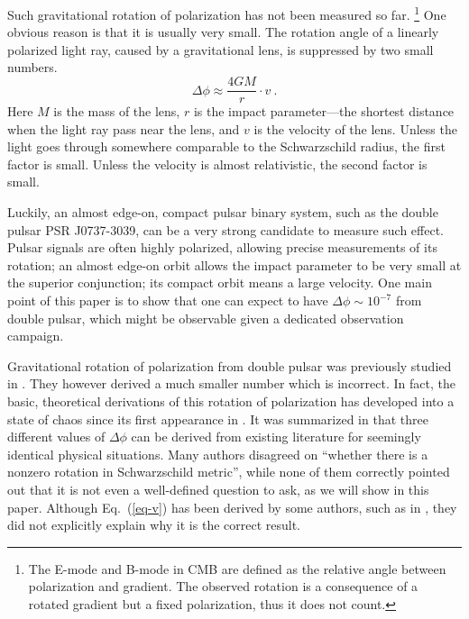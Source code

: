 \documentclass[aps,showpacs,onecolumn,floats,prd,superscriptaddress,nofootinbib]{revtex4}
\begin{document}
Such gravitational rotation of polarization has not been measured so far.
\footnote{The E-mode and B-mode in CMB are defined as the relative angle between polarization and gradient. 
The observed rotation is a consequence of a rotated gradient but a fixed polarization, thus it does not count.} 
One obvious reason is that it is usually very small. 
The rotation angle of a linearly polarized light ray, caused by a gravitational lens, is suppressed by two small numbers.
\begin{equation}
\Delta\phi \approx \frac{4GM}{r} \cdot v~.
\label{eq-v}
\end{equation}
Here $M$ is the mass of the lens, $r$ is the impact parameter---the shortest distance when the light ray pass near the lens, and $v$ is the velocity of the lens.  
Unless the light goes through somewhere comparable to the Schwarzschild radius, the first factor is small. 
Unless the velocity is almost relativistic, the second factor is small. 

Luckily, an almost edge-on, compact pulsar binary system, such as the double pulsar PSR J0737-3039, can be a very strong candidate to measure such effect. 
Pulsar signals are often highly polarized, allowing precise measurements of its rotation; 
an almost edge-on orbit allows the impact parameter to be very small at the superior conjunction; 
its compact orbit means a large velocity. 
One main point of this paper is to show that one can expect to have $\Delta\phi\sim 10^{-7}$ from double pulsar, which might be observable given a dedicated observation campaign.

Gravitational rotation of polarization from double pulsar was previously studied in \cite{RugTar06}. 
They however derived a much smaller number which is incorrect. 
In fact, the basic, theoretical derivations of this rotation of polarization has developed into a state of chaos since its first appearance in \cite{Skr57}.
It was summarized in \cite{BroDem11} that three different values of $\Delta\phi$ can be derived from existing literature for seemingly identical physical situations.
Many authors disagreed on ``whether there is a nonzero rotation in Schwarzschild metric'', while none of them correctly pointed out that it is not even a well-defined question to ask, as we will show in this paper.
Although Eq.~(\ref{eq-v}) has been derived by some authors, such as in \cite{KopMas01}, they did not explicitly explain why it is the correct result. 
\end{document}
